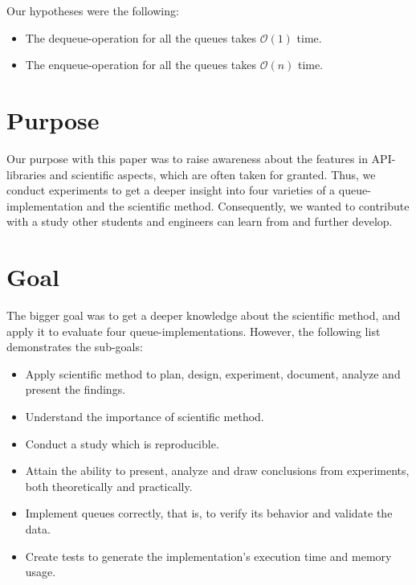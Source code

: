 \documentclass[a4paper,11pt]{kth-mag}
\newcommand*{\skippara}{\par\vspace{\baselineskip} \noindent}
\begin{document}
\skippara Our hypotheses were the following:
\begin{itemize}
    \item The dequeue-operation for all the queues takes $\mathcal{O}(1)$ time.
    \item The enqueue-operation for all the queues takes $\mathcal{O}(n)$ time.
\end{itemize}

\section{Purpose}
Our purpose with this paper was to raise awareness about the features in API-libraries and scientific aspects, which are often taken for granted.
Thus, we conduct experiments to get a deeper insight into four varieties of a queue-implementation and the scientific method.
Consequently, we wanted to contribute with a study other students and engineers can learn from and further develop.

\section{Goal}
The bigger goal was to get a deeper knowledge about the scientific method, and apply it to evaluate four queue-implementations.
However, the following list demonstrates the sub-goals:
\begin{itemize}
    \item Apply scientific method to plan, design, experiment, document, analyze and present the findings.
    \item Understand the importance of scientific method.
    \item Conduct a study which is reproducible.
    \item Attain the ability to present, analyze and draw conclusions from experiments, both theoretically and practically.
    \item Implement queues correctly, that is, to verify its behavior and validate the data.
    \item Create tests to generate the implementation's execution time and memory usage.
\end{itemize}

\end{document}
